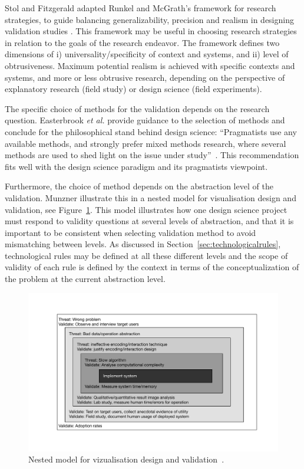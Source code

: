 \documentclass[graybox]{svmult}
\begin{document}
Stol and Fitzgerald adapted Runkel and McGrath's framework for research strategies, to guide balancing generalizability, precision and realism in designing validation studies \cite{StolABC18}. This framework may be useful in choosing research strategies in relation to the goals of the research endeavor. The framework defines two dimensions of i) universality/specificity of context and systems, and ii) level of obtrusiveness. Maximum potential realism is achieved with specific contexts and systems, and more or less obtrusive research, depending on the perspective of explanatory research (field study) or design science (field experiments).  

The specific choice of methods for the validation depends on the research question. Easterbrook \emph{et al.} provide guidance to the selection of methods and conclude for the philosophical stand behind design science: ``Pragmatists use any available methods, and strongly prefer mixed methods research, where several methods are used to shed light on the issue under study''~\cite{easterbrook_selecting_2008}. This recommendation fits well with the design science paradigm and its pragmatists viewpoint.

Furthermore, the choice of method depends on the abstraction level of the validation. Munzner illustrate this in a nested model for visualisation design and validation, see Figure~\ref{fig:nested_model}. This model illustrates how one design science project must respond to validity questions at several levels of abstraction, and that it is important to be consistent when selecting validation method to avoid mismatching between levels. As discussed in Section~\ref{sec:technologicalrules}, technological rules may be defined at all these different levels and the scope of validity of each rule is defined by the context in terms of the conceptualization of the problem at the current abstraction level.

\begin{figure}[t]
  \includegraphics[width=\textwidth]{Figures/nested_model.pdf}
\caption{Nested model for vizualisation design and validation~\cite{munzner2009}.}
\label{fig:nested_model}       %
\end{figure} 
\end{document}
